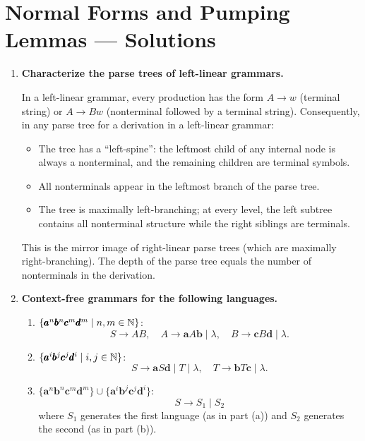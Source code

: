 
\chapter{Normal Forms and Pumping Lemmas --- Solutions}

\begin{enumerate}[{9.}1. ]

\item \textbf{Characterize the parse trees of left-linear grammars.}

In a left-linear grammar, every production has the form $A \to w$ (terminal string) or $A \to Bw$ (nonterminal followed by a terminal string). Consequently, in any parse tree for a derivation in a left-linear grammar:
\begin{itemize}
\item The tree has a ``left-spine'': the leftmost child of any internal node is always a nonterminal, and the remaining children are terminal symbols.
\item All nonterminals appear in the leftmost branch of the parse tree.
\item The tree is maximally left-branching; at every level, the left subtree contains all nonterminal structure while the right siblings are terminals.
\end{itemize}
This is the mirror image of right-linear parse trees (which are maximally right-branching). The depth of the parse tree equals the number of nonterminals in the derivation.

\item \textbf{Context-free grammars for the following languages.}

\begin{enumerate}
\item $\{\pmb{a}^n\pmb{b}^n\pmb{c}^m\pmb{d}^m \mid n,m \in \mathbb{N}\}$:
\[
S \to AB, \quad A \to \pmb{a}A\pmb{b} \mid \lambda, \quad B \to \pmb{c}B\pmb{d} \mid \lambda.
\]

\item $\{\pmb{a}^i\pmb{b}^j\pmb{c}^j\pmb{d}^i \mid i,j \in \mathbb{N}\}$:
\[
S \to \pmb{a}S\pmb{d} \mid T \mid \lambda, \quad T \to \pmb{b}T\pmb{c} \mid \lambda.
\]

\item $\{\pmb{a}^n\pmb{b}^n\pmb{c}^m\pmb{d}^m\} \cup \{\pmb{a}^i\pmb{b}^j\pmb{c}^j\pmb{d}^i\}$:
\[
S \to S_1 \mid S_2
\]
where $S_1$ generates the first language (as in part (a)) and $S_2$ generates the second (as in part (b)).
\end{enumerate}


\end{enumerate}
